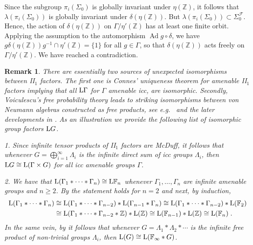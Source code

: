 \documentclass[a4paper,11pt]{amsart}
\numberwithin{equation}{section}
\newtheorem{remark}[definition]{Remark}
\begin{document}
Since the subgroup $\pi_i(\Sigma_0)$ is globally invariant under $\eta({\mathbb{Z}})$, it follows that $\lambda(\pi_i(\Sigma_0))$ is globally invariant under $\delta(\eta({\mathbb{Z}}))$. But $\lambda(\pi_i(\Sigma_0)) \subset \Sigma_0^{\mathcal{F}}$. Hence, the action of $\delta(\eta({\mathbb{Z}}))$ on $\Gamma/\eta'({\mathbb{Z}})$ has at least one finite orbit. Applying the assumption to the automorphism ${\operatorname{Ad}} g \circ \delta$, we have $g \delta(\eta({\mathbb{Z}})) g^{-1} \cap \eta'({\mathbb{Z}}) = \{1\}$ for all $g \in \Gamma$, so that $\delta(\eta({\mathbb{Z}}))$ acts freely on $\Gamma/\eta'({\mathbb{Z}})$. We have reached a contradiction.

\begin{remark}\label{rem.ex-isom}
There are essentially two sources of unexpected isomorphisms between II$_1$ factors. The first one is Connes' uniqueness theorem for amenable II$_1$ factors \cite{Co75} implying that all ${\mathord{\text{\rm L}}} \Gamma$ for $\Gamma$ amenable icc, are isomorphic. Secondly, Voiculescu's free probability theory leads to striking isomorphisms between von Neumann algebras constructed as free products, see e.g.\ \cite{Vo89} and the later developments in \cite{Dy92a,Dy92b,DR98}. As an illustration we provide the following list of isomorphic group factors ${\mathord{\text{\rm L}}} G$.

1. Since infinite tensor products of II$_1$ factors are McDuff, it follows that whenever $G = \bigoplus_{i=1}^\infty \Lambda_i$ is the infinite direct sum of icc groups $\Lambda_i$, then ${\mathord{\text{\rm L}}} G \cong {\mathord{\text{\rm L}}}(\Gamma \times G)$ for all icc amenable groups $\Gamma$.

2. We have that ${\mathord{\text{\rm L}}}(\Gamma_1 * \cdots * \Gamma_n) \cong {\mathord{\text{\rm L}}} {\mathbb{F}}_n$ whenever $\Gamma_1,\ldots,\Gamma_n$ are infinite amenable groups and $n {\geqslant} 2$. By \cite[Corollary 5.3]{Dy92b} the statement holds for $n=2$ and next, by induction,
\begin{align*}
{\mathord{\text{\rm L}}}(\Gamma_1 * \cdots * \Gamma_n) & \cong {\mathord{\text{\rm L}}}(\Gamma_1 * \cdots * \Gamma_{n-2}) * {\mathord{\text{\rm L}}}(\Gamma_{n-1} * \Gamma_n)
 \cong {\mathord{\text{\rm L}}}(\Gamma_1 * \cdots * \Gamma_{n-2}) * {\mathord{\text{\rm L}}}({\mathbb{F}}_2)\\
& \cong {\mathord{\text{\rm L}}}(\Gamma_1 * \cdots * \Gamma_{n-2} * {\mathbb{Z}}) * {\mathord{\text{\rm L}}}({\mathbb{Z}}) \cong {\mathord{\text{\rm L}}}({\mathbb{F}}_{n-1}) * {\mathord{\text{\rm L}}}({\mathbb{Z}}) \cong {\mathord{\text{\rm L}}}({\mathbb{F}}_n) \; .
\end{align*}
In the same vein, by \cite[Theorem 1.5]{DR98} it follows that whenever $G = \Lambda_1 * \Lambda_2 * \cdots$ is the infinite free product of non-trivial groups $\Lambda_i$, then ${\mathord{\text{\rm L}}}(G) \cong {\mathord{\text{\rm L}}}({\mathbb{F}}_\infty * G)$.


\end{remark}
\end{document}
